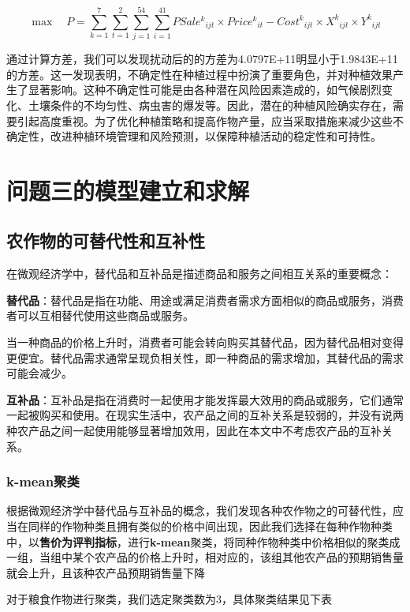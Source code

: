 \documentclass[withoutpreface,bwprint]{cumcmthesis} %
\begin{document}
\begin{equation}
	\max \quad P=\sum_{k=1}^7{\sum_{t=1}^2{\sum_{j=1}^{54}{\sum_{i=1}^{41}{{PSale^k}_{ijt}\times {Price^k}_{it}-{Cost^k}_{ijt}}\times {X^k}_{ijt}\times {Y^k}_{ijt}}}}
\end{equation}



通过计算方差，我们可以发现扰动后的的方差为4.0797E+11明显小于1.9843E+11的方差。这一发现表明，不确定性在种植过程中扮演了重要角色，并对种植效果产生了显著影响。这种不确定性可能是由各种潜在风险因素造成的，如气候剧烈变化、土壤条件的不均匀性、病虫害的爆发等。因此，潜在的种植风险确实存在，需要引起高度重视。为了优化种植策略和提高作物产量，应当采取措施来减少这些不确定性，改进种植环境管理和风险预测，以保障种植活动的稳定性和可持性。
\section{问题三的模型建立和求解}
\subsection{农作物的可替代性和互补性}

在微观经济学中，替代品和互补品是描述商品和服务之间相互关系的重要概念：

\textbf{替代品}：替代品是指在功能、用途或满足消费者需求方面相似的商品或服务，消费者可以互相替代使用这些商品或服务。

当一种商品的价格上升时，消费者可能会转向购买其替代品，因为替代品相对变得更便宜。替代品需求通常呈现负相关性，即一种商品的需求增加，其替代品的需求可能会减少。

\textbf{互补品}：互补品是指在消费时一起使用才能发挥最大效用的商品或服务，它们通常一起被购买和使用。在现实生活中，农产品之间的互补关系是较弱的，并没有说两种农产品之间一起使用能够显著增加效用，因此在本文中不考虑农产品的互补关系。
\subsubsection{k-mean聚类}

根据微观经济学中替代品与互补品的概念，我们发现各种农作物之的可替代性，应当在同样的作物种类且拥有类似的价格中间出现，因此我们选择在每种作物种类中，以\textbf{售价为评判指标}，进行\textbf{k-mean}聚类，将同种作物种类中价格相似的聚类成一组，当组中某个农产品的价格上升时，相对应的，该组其他农产品的预期销售量就会上升，且该种农产品预期销售量下降


对于粮食作物进行聚类，我们选定聚类数为3，具体聚类结果见下表
\end{document}
